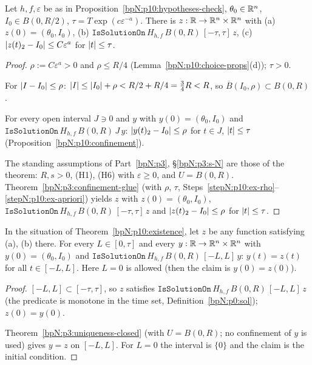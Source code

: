 \begin{theorem}\label{bpN:p10:existence}
Let $h,f,\varepsilon$ be as in Proposition~\ref{bpN:p10:hypotheses-check}, $\theta_0\in\mathbb{R}^n$, $I_0\in B(0,R/2)$, $\tau=T\exp(c\varepsilon^{-a})$. There is $z:\mathbb{R}\to\mathbb{R}^n\times\mathbb{R}^n$ with (a) $z(0)=(\theta_0,I_0)$, (b) $\texttt{IsSolutionOn}\,H_{h,f}\,B(0,R)\,[-\tau,\tau]\,z$, (c) $\lvert z(t)_2-I_0\rvert\le C\varepsilon^a$ for $\lvert t\rvert\le\tau$.
\end{theorem}
\begin{proof}
\label{stepN:p10:ex-rho} $\rho:=C\varepsilon^a>0$ and $\rho\le R/4$ (Lemma~\ref{bpN:p10:choice-props}(d)); $\tau>0$.

\label{stepN:p10:ex-ball} For $\lvert I-I_0\rvert\le\rho$: $\lvert I\rvert\le\lvert I_0\rvert+\rho<R/2+R/4=\frac34R<R$, so $\overline B(I_0,\rho)\subset B(0,R)$.

\label{stepN:p10:ex-apriori} For every open interval $J\ni0$ and $y$ with $y(0)=(\theta_0,I_0)$ and $\texttt{IsSolutionOn}\,H_{h,f}\,B(0,R)\,J\,y$: $\lvert y(t)_2-I_0\rvert\le\rho$ for $t\in J$, $\lvert t\rvert\le\tau$ (Proposition~\ref{bpN:p10:confinement}).

\label{stepN:p10:ex-glue} The standing assumptions of Part~\ref{bpN:p3}, \S\ref{bpN:p3:s-N} are those of the theorem: $R,s>0$, (H1), (H6) with $\varepsilon\ge0$, and $U=B(0,R)$. Theorem~\ref{bpN:p3:confinement-glue} (with $\rho$, $\tau$, Steps~\ref{stepN:p10:ex-rho}--\ref{stepN:p10:ex-apriori}) yields $z$ with $z(0)=(\theta_0,I_0)$, $\texttt{IsSolutionOn}\,H_{h,f}\,B(0,R)\,[-\tau,\tau]\,z$ and $\lvert z(t)_2-I_0\rvert\le\rho$ for $\lvert t\rvert\le\tau$.
\end{proof}

\begin{theorem}[Uniqueness on ${[-L,L]}$]\label{bpN:p10:uniqueness}
In the situation of Theorem~\ref{bpN:p10:existence}, let $z$ be any function satisfying (a), (b) there. For every $L\in[0,\tau]$ and every $y:\mathbb{R}\to\mathbb{R}^n\times\mathbb{R}^n$ with $y(0)=(\theta_0,I_0)$ and $\texttt{IsSolutionOn}\,H_{h,f}\,B(0,R)\,[-L,L]\,y$: $y(t)=z(t)$ for all $t\in[-L,L]$.
Here $L=0$ is allowed (then the claim is $y(0)=z(0)$).
\end{theorem}
\begin{proof}
\label{stepN:p10:un-restrict} $[-L,L]\subset[-\tau,\tau]$, so $z$ satisfies $\texttt{IsSolutionOn}\,H_{h,f}\,B(0,R)\,[-L,L]\,z$ (the predicate is monotone in the time set, Definition~\ref{bpN:p0:sol}); $z(0)=y(0)$.

\label{stepN:p10:un-apply} Theorem~\ref{bpN:p3:uniqueness-closed} (with $U=B(0,R)$; no confinement of $y$ is used) gives $y=z$ on $[-L,L]$. For $L=0$ the interval is $\{0\}$ and the claim is the initial condition.
\end{proof}

